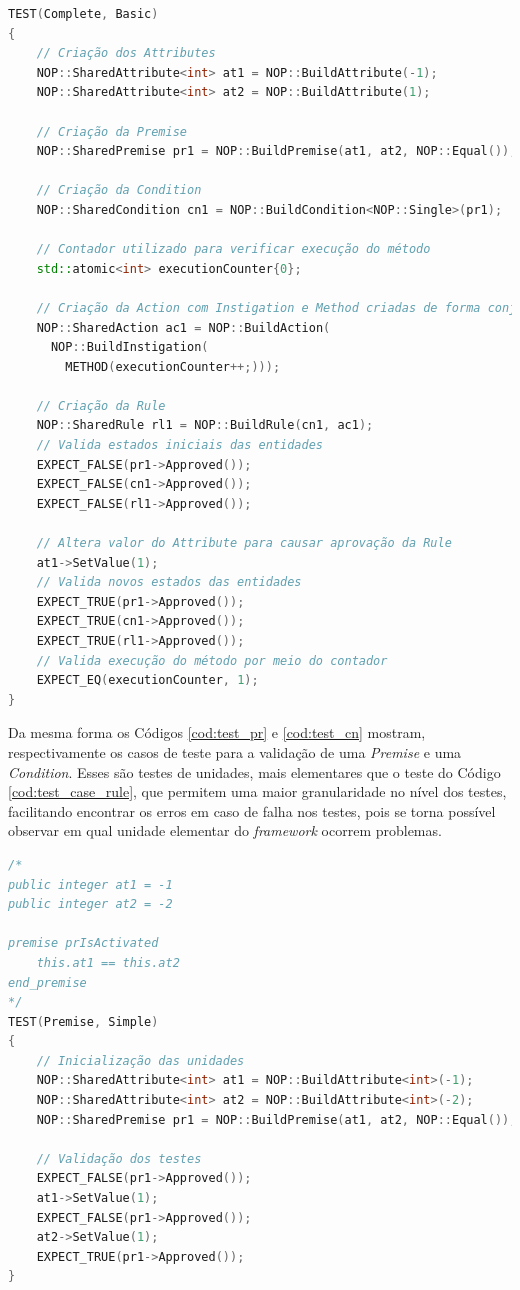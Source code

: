 \begin{lstlisting}[language=C++, caption = {Caso de teste do \textit{Framework} PON C++
4.0}, source = {Autoria própria}, label ={cod:test_case_rule}]
TEST(Complete, Basic)
{
    // Criação dos Attributes
    NOP::SharedAttribute<int> at1 = NOP::BuildAttribute(-1);
    NOP::SharedAttribute<int> at2 = NOP::BuildAttribute(1);

    // Criação da Premise
    NOP::SharedPremise pr1 = NOP::BuildPremise(at1, at2, NOP::Equal());

    // Criação da Condition
    NOP::SharedCondition cn1 = NOP::BuildCondition<NOP::Single>(pr1);

    // Contador utilizado para verificar execução do método
    std::atomic<int> executionCounter{0};

    // Criação da Action com Instigation e Method criadas de forma conjunta
    NOP::SharedAction ac1 = NOP::BuildAction(
      NOP::BuildInstigation(
        METHOD(executionCounter++;)));

    // Criação da Rule
    NOP::SharedRule rl1 = NOP::BuildRule(cn1, ac1);
    // Valida estados iniciais das entidades
    EXPECT_FALSE(pr1->Approved());
    EXPECT_FALSE(cn1->Approved());
    EXPECT_FALSE(rl1->Approved());

    // Altera valor do Attribute para causar aprovação da Rule
    at1->SetValue(1);
    // Valida novos estados das entidades
    EXPECT_TRUE(pr1->Approved());
    EXPECT_TRUE(cn1->Approved());
    EXPECT_TRUE(rl1->Approved());
    // Valida execução do método por meio do contador
    EXPECT_EQ(executionCounter, 1);
}
\end{lstlisting}

Da mesma forma os Códigos \ref{cod:test_pr} e \ref{cod:test_cn} mostram,
respectivamente os casos de teste para a validação de uma \textit{Premise} e uma
\textit{Condition}. Esses são testes de unidades, mais elementares que o teste
do Código \ref{cod:test_case_rule}, que permitem uma maior granularidade no
nível dos testes, facilitando encontrar os erros em caso de falha nos testes,
pois se torna possível observar em qual unidade elementar do \textit{framework}
ocorrem problemas.

\begin{lstlisting}[caption = {Caso de teste para \textit{Premise} do \textit{Framework} PON C++ 4.0},
source = {Autoria própria}, float=htb, language=C++,
label = {cod:test_pr},
]
/*
public integer at1 = -1
public integer at2 = -2

premise prIsActivated
    this.at1 == this.at2
end_premise
*/
TEST(Premise, Simple)
{
    // Inicialização das unidades
    NOP::SharedAttribute<int> at1 = NOP::BuildAttribute<int>(-1);
    NOP::SharedAttribute<int> at2 = NOP::BuildAttribute<int>(-2);
    NOP::SharedPremise pr1 = NOP::BuildPremise(at1, at2, NOP::Equal());

    // Validação dos testes
    EXPECT_FALSE(pr1->Approved());
    at1->SetValue(1);
    EXPECT_FALSE(pr1->Approved());
    at2->SetValue(1);
    EXPECT_TRUE(pr1->Approved());
}
\end{lstlisting}

